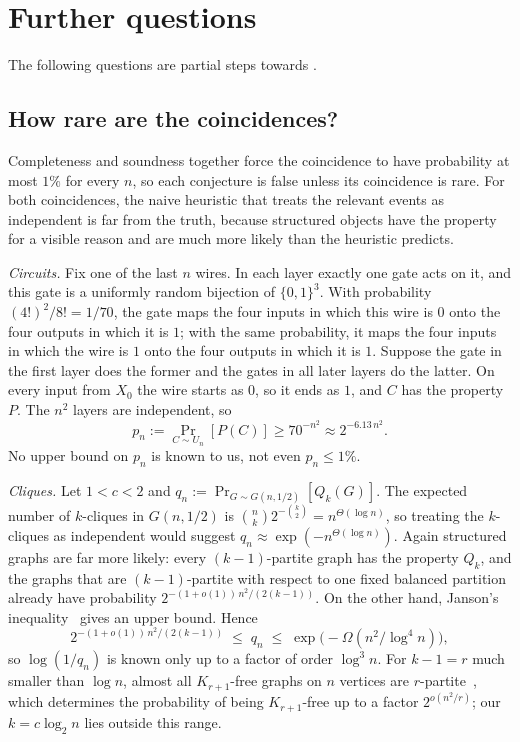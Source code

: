 \documentclass[11pt]{article}
\theoremstyle{remark}
\begin{document}
\section*{Further questions}

The following questions are partial steps towards .

\subsection*{How rare are the coincidences?}

Completeness and soundness together force the coincidence to have probability at most $1\%$ for every $n$, so each conjecture is false unless its coincidence is rare. For both coincidences, the naive heuristic that treats the relevant events as independent is far from the truth, because structured objects have the property for a visible reason and are much more likely than the heuristic predicts.

\emph{Circuits.} Fix one of the last $n$ wires. In each layer exactly one gate acts on it, and this gate is a uniformly random bijection of $\{0,1\}^3$. With probability $(4!)^2/8! = 1/70$, the gate maps the four inputs in which this wire is $0$ onto the four outputs in which it is $1$; with the same probability, it maps the four inputs in which the wire is $1$ onto the four outputs in which it is $1$. Suppose the gate in the first layer does the former and the gates in all later layers do the latter. On every input from $X_0$ the wire starts as $0$, so it ends as $1$, and $C$ has the property $P$. The $n^2$ layers are independent, so
\[
    p_n := \Pr_{C \sim U_n}[P(C)] \geq 70^{-n^2} \approx 2^{-6.13\, n^2}.
\]
No upper bound on $p_n$ is known to us, not even $p_n \leq 1\%$.

\emph{Cliques.} Let $1 < c < 2$ and $q_n := \Pr_{G \sim G(n, 1/2)}[Q_k(G)]$. The expected number of $k$-cliques in $G(n, 1/2)$ is $\binom{n}{k} 2^{-\binom{k}{2}} = n^{\Theta(\log n)}$, so treating the $k$-cliques as independent would suggest $q_n \approx \exp(-n^{\Theta(\log n)})$. Again structured graphs are far more likely: every $(k-1)$-partite graph has the property $Q_k$, and the graphs that are $(k-1)$-partite with respect to one fixed balanced partition already have probability $2^{-(1 + o(1))\, n^2/(2(k-1))}$. On the other hand, Janson's inequality~\cite[Chapter~8]{alon-spencer} gives an upper bound. Hence
\[
    2^{-(1 + o(1))\, n^2/(2(k-1))} \;\leq\; q_n \;\leq\; \exp\big(-\Omega(n^2/\log^4 n)\big),
\]
so $\log(1/q_n)$ is known only up to a factor of order $\log^3 n$. For $k - 1 = r$ much smaller than $\log n$, almost all $K_{r+1}$-free graphs on $n$ vertices are $r$-partite~\cite{bbclms,balogh-samotij2020}, which determines the probability of being $K_{r+1}$-free up to a factor $2^{o(n^2/r)}$; our $k = c \log_2 n$ lies outside this range.
\end{document}
